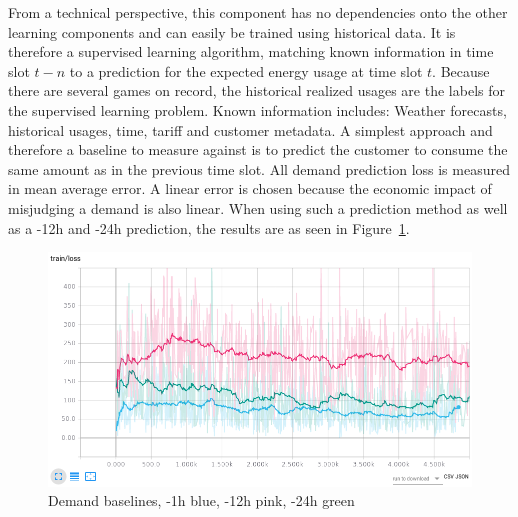 From a technical perspective, this component has no dependencies onto the other learning components and can easily be
trained using historical data. It is therefore a supervised learning algorithm, matching known information in time slot
$t-n$ to a prediction for the expected energy usage at time slot $t$. Because there are several games on record, the
historical realized usages are the labels for the supervised learning problem. Known information includes: Weather
forecasts, historical usages, time, tariff and customer metadata. A simplest approach and therefore a baseline to
measure against is to predict the customer to consume the same amount as in the previous time slot. All demand
prediction loss is measured in mean average error. A linear error is chosen because the economic impact of misjudging a
demand is also linear. When using such a prediction method as well as a -12h and -24h prediction, the results are as
seen in Figure~\ref{fig:demand_baseline}.

\begin{figure}[]
    \centering
    \includegraphics[width=0.8\linewidth]{img/demand_baselines.png}
    \caption{Demand baselines, -1h blue, -12h pink, -24h green}
    \label{fig:demand_baseline}
\end{figure}

